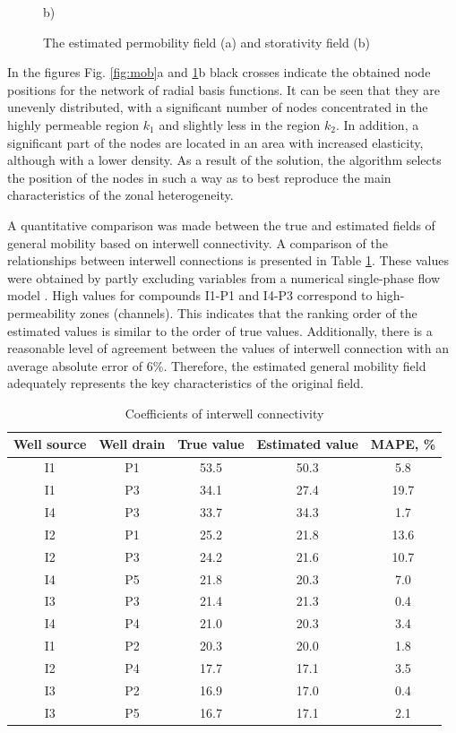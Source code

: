 \documentclass[
11pt,%
tightenlines,%
twoside,%
onecolumn,%
nofloats,%
nobibnotes,%
nofootinbib,%
superscriptaddress,%
noshowpacs,%
centertags]%
{revtex4}
\begin{document}
\begin{figure}
\begin{minipage}[h]{0.48\linewidth}
		b)
		\label{fig:comp}
	\end{minipage}
	\caption{The estimated permobility field (a) and storativity field (b)}
\end{figure}

In the figures Fig. \ref{fig:mob}a and \ref{fig:comp}b black crosses indicate the obtained node positions for the network of radial basis functions. It can be seen that they are unevenly distributed, with a significant number of nodes concentrated in the highly permeable region $k_1$ and slightly less in the region $k_2$. In addition, a significant part of the nodes are located in an area with increased elasticity, although with a lower density.
As a result of the solution, the algorithm selects the position of the nodes in such a way as to best reproduce the main characteristics of the zonal heterogeneity.

A quantitative comparison was made between the true and estimated fields of general mobility based on interwell connectivity. A comparison of the relationships between interwell connections is presented in Table \ref{tabl:connection}. These values were obtained by partly excluding variables from a numerical single-phase flow model \cite{and}. High values for compounds I1-P1 and I4-P3 correspond to high-permeability zones (channels). This indicates that the ranking order of the estimated values is similar to the order of true values. Additionally, there is a reasonable level of agreement between the values of interwell connection with an average absolute error of 6\%. Therefore, the estimated general mobility field adequately represents the key characteristics of the original field. 

\begin{table}[h!]
	\caption{Coefficients of interwell connectivity}	
	\label{tabl:connection}	
	\begin{center}
		\begin{tabular}{c|c|c|c|c}
			\hline
			Well source &  Well drain & True value & Estimated  value & MAPE, \% \\
			\hline
				I1 & P1 & 53.5 & 50.3 & 5.8 \\
				I1 & P3 & 34.1 & 27.4 & 19.7 \\
				I4 & P3 & 33.7 & 34.3 & 1.7 \\
				I2 & P1 & 25.2 & 21.8 & 13.6 \\
				I2 & P3 & 24.2 & 21.6 & 10.7 \\
				I4 & P5 & 21.8 & 20.3 & 7.0 \\
				I3 & P3 & 21.4 & 21.3 & 0.4 \\
				I4 & P4 & 21.0 & 20.3 & 3.4 \\
				I1 & P2 & 20.3 & 20.0 & 1.8 \\
				I2 & P4 & 17.7 & 17.1 & 3.5 \\
				I3 & P2 & 16.9 & 17.0 & 0.4 \\
				I3 & P5 & 16.7 & 17.1 & 2.1 \\
			\hline
		\end{tabular}
	\end{center}
\end{table}
\end{document}
